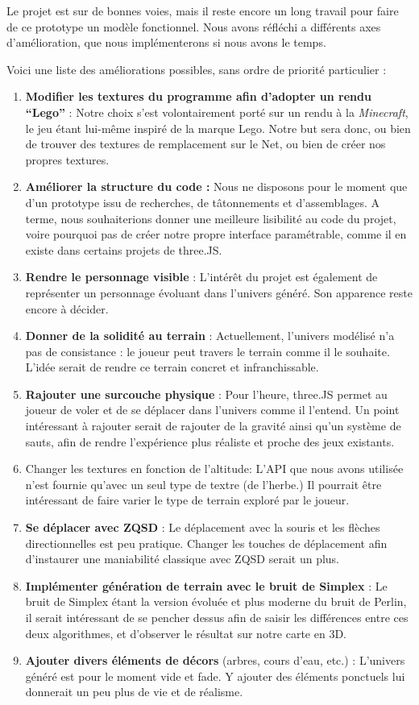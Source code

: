 Le projet est sur de bonnes voies, mais il reste encore un long travail pour faire de ce prototype un modèle fonctionnel. Nous avons réfléchi a différents axes d'amélioration, que nous implémenterons si nous avons le temps.

Voici une liste des améliorations possibles, sans ordre de priorité particulier :

\vspace{0.5cm}
\begin{enumerate}
	\item \textbf{Modifier les textures du programme afin d'adopter un rendu "`Lego"'} : Notre choix s'est volontairement porté sur un rendu à la \textit{Minecraft}, le jeu étant lui-même inspiré de la marque Lego. Notre but sera donc, ou bien de trouver des textures de remplacement sur le Net, ou bien de créer nos propres textures.
	\item \textbf{Améliorer la structure du code :} Nous ne disposons pour le moment que d'un prototype issu de recherches, de tâtonnements et d'assemblages. A terme, nous souhaiterions donner une meilleure lisibilité au code du projet, voire pourquoi pas de créer notre propre interface paramétrable, comme il en existe dans certains projets de three.JS.
	\item \textbf{Rendre le personnage visible} : L'intérêt du projet est également de représenter un personnage évoluant dans l'univers généré. Son apparence reste encore à décider.
	\item \textbf{Donner de la solidité au terrain }: Actuellement, l'univers modélisé n'a pas de consistance : le joueur peut travers le terrain comme il le souhaite. L'idée serait de rendre ce terrain concret et infranchissable.
	\item \textbf{Rajouter une surcouche physique }: Pour l'heure, three.JS permet au joueur de voler et de se déplacer dans l'univers comme il l'entend. Un point intéressant à rajouter serait de rajouter de la gravité ainsi qu'un système de sauts, afin de rendre l'expérience plus réaliste et proche des jeux existants.
	\item Changer les textures en fonction de l'altitude: L'API que nous avons utilisée n'est fournie qu'avec un seul type de textre (de l'herbe.) Il pourrait être intéressant de faire varier le type de terrain exploré par le joueur.
	\item \textbf{Se déplacer avec ZQSD} : Le déplacement avec la souris et les flèches directionnelles est peu pratique. Changer les touches de déplacement afin d'instaurer une maniabilité classique avec ZQSD serait un plus.
	\item \textbf{Implémenter génération de terrain avec le bruit de Simplex }: Le bruit de Simplex étant la version évoluée et plus moderne du bruit de Perlin, il serait intéressant de se pencher dessus afin de saisir les différences entre ces deux algorithmes, et d'observer le résultat sur notre carte en 3D. 
	\item \textbf{Ajouter divers éléments de décors }(arbres, cours d'eau, etc.) : L'univers généré est pour le moment vide et fade. Y ajouter des éléments ponctuels lui donnerait un peu plus de vie et de réalisme.
\end{enumerate}
\vspace{0.5cm}

